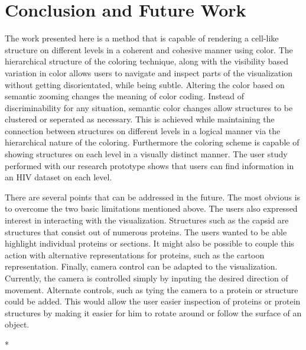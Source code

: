 \documentclass[review,journal]{vgtc}         %
\begin{document}
	
	
	\section{Conclusion and Future Work}
	The work presented here is a method that is capable of rendering a cell-like structure on different levels in a coherent and cohesive manner using color. 
	The hierarchical structure of the coloring technique, along with the visibility based variation in color allows users to navigate and inspect parts of the visualization without getting disorientated, while being subtle.
	Altering the color based on semantic zooming changes the meaning of color coding.
	Instead of discriminability for any situation, semantic color changes allow structures to be clustered or seperated as necessary.
	This is achieved while maintaining the connection between structures on different levels in a logical manner via the hierarchical nature of the coloring.
	Furthermore the coloring scheme is capable of showing structures on each level in a visually distinct manner. 
	The user study performed with our research prototype shows that users can find information in an HIV dataset on each level. 
	
	
	
	
	
	
	
	There are several points that can be addressed in the future. The most obvious is to overcome the two basic limitations mentioned above. 
	The users also expressed interest in interacting with the visualization. 
	Structures such as the capsid are structures that consist out of numerous proteins. 
	The users wanted to be able highlight individual proteins or sections. 
	It might also be possible to couple this action with alternative representations for proteins, such as the cartoon representation.
	Finally, camera control can be adapted to the visualization. 
	Currently, the camera is controlled simply by inputing the desired direction of movement. 
	Alternate controls, such as tying the camera to a protein or structure could be added.
	This would allow the user easier inspection of proteins or protein structures by making it easier for him to rotate around or follow the surface of an object.
	
	
	
	
	
	{*}
	
\end{document}
